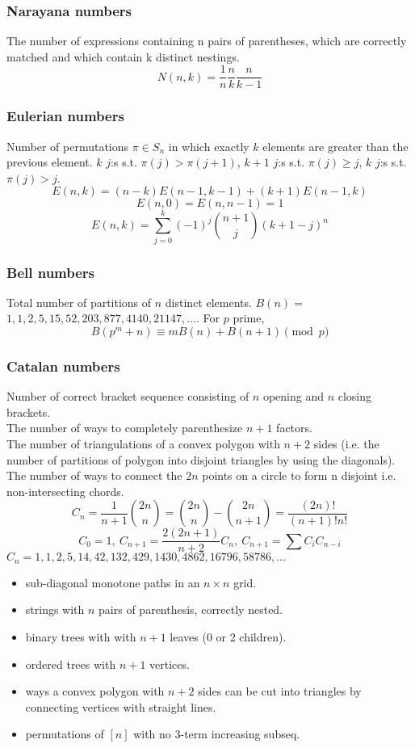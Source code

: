 \documentclass[
	a4paper,
	landscape,
	10pt,
]{article}
\begin{document}
\begin{multicols}{3}
	\subsubsection*{Narayana numbers} The number of expressions containing n pairs of parentheses, which are correctly matched and which contain k distinct nestings. 
		$$ N(n,k) = \frac{1}{n} \frac{n}{k} \frac{n}{k-1} $$

	\subsubsection*{Eulerian numbers}
		Number of permutations $\pi \in S_n$ in which exactly $k$ elements are greater than the previous element. $k$ $j$:s s.t. $\pi(j)>\pi(j+1)$, $k+1$ $j$:s s.t. $\pi(j)\geq j$, $k$ $j$:s s.t. $\pi(j)>j$.
		$$E(n,k) = (n-k)E(n-1,k-1) + (k+1)E(n-1,k)$$
		$$E(n,0) = E(n,n-1) = 1$$
		$$E(n,k) = \sum_{j=0}^k(-1)^j\binom{n+1}{j}(k+1-j)^n$$


	\subsubsection*{Bell numbers}
		Total number of partitions of $n$ distinct elements. $B(n) =$
		$1, 1, 2, 5, 15, 52, 203, 877, 4140, 21147, \dots$. For $p$ prime,
		\[ B(p^m+n)\equiv mB(n)+B(n+1) \pmod{p} \]

	\subsubsection*{Catalan numbers}
		Number of correct bracket sequence consisting of $n$ opening and $n$
		closing brackets. \\
		The number of ways to completely parenthesize $n+1$ factors. \\
		The number of triangulations of a convex polygon with $n+2$
		sides (i.e. the number of partitions of polygon into disjoint triangles by using the diagonals). \\
		The number of ways to connect the $2n$
		points on a circle to form n disjoint i.e. non-intersecting chords.
		\[ C_n=\frac{1}{n+1}\binom{2n}{n}= \binom{2n}{n}-\binom{2n}{n+1} = \frac{(2n)!}{(n+1)!n!} \]
		\[ C_0=1,\ C_{n+1} = \frac{2(2n+1)}{n+2}C_n,\ C_{n+1}=\sum C_iC_{n-i} \]
		${C_n = 1, 1, 2, 5, 14, 42, 132, 429, 1430, 4862, 16796, 58786, \dots}$
		\begin{itemize}[noitemsep]
			\item sub-diagonal monotone paths in an $n\times n$ grid.
			\item strings with $n$ pairs of parenthesis, correctly nested.
			\item binary trees with with $n+1$ leaves (0 or 2 children).
			\item ordered trees with $n+1$ vertices.
			\item ways a convex polygon with $n+2$ sides can be cut into triangles by connecting vertices with straight lines.
			\item permutations of $[n]$ with no 3-term increasing subseq.
		\end{itemize}


\end{multicols}
\end{document}
